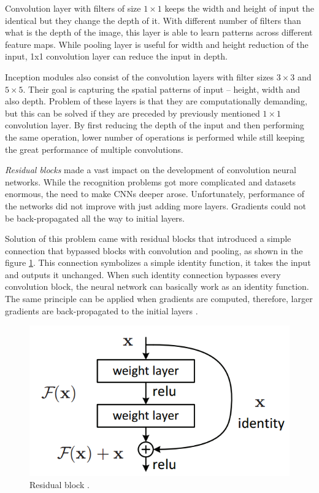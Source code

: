 Convolution layer with filters of size $1 \times 1$ keeps the width and height of input the identical but they change the depth of it. With different number of filters than what is the depth of the image, this layer is able to learn patterns across different feature maps. While pooling layer is useful for width and height reduction of the input, 1x1 convolution layer can reduce the input in depth.

Inception modules also consist of the convolution layers with filter sizes $3 \times 3$ and $5 \times 5$. Their goal is capturing the spatial patterns of input -- height, width and also depth. Problem of these layers is that they are computationally demanding, but this can be solved if they are preceded by previously mentioned $1 \times 1$ convolution layer. By first reducing the depth of the input and then performing the same operation, lower number of operations is performed while still keeping the great performance of multiple convolutions.

\textit{Residual blocks} made a vast impact on the development of convolution neural networks. While the recognition problems got more complicated and datasets enormous, the need to make CNNs deeper arose. Unfortunately, performance of the networks did not improve with just adding more layers. Gradients could not be back-propagated all the way to initial layers.

Solution of this problem came with residual blocks that introduced a simple connection that bypassed blocks with convolution and pooling, as shown in the figure \ref{fig:residual}. This connection symbolizes a simple identity function, it takes the input and outputs it unchanged. When such identity connection bypasses every convolution block, the neural network can basically work as an identity function. The same principle can be applied when gradients are computed, therefore, larger gradients are back-propagated to the initial layers \cite{he2015deep}.

\begin{figure}[ht]\centering
    \centering
    \includegraphics[scale=0.3]{figures/todo-residual.png}
    \caption{Residual block .}
    \label{fig:residual}
\end{figure}

